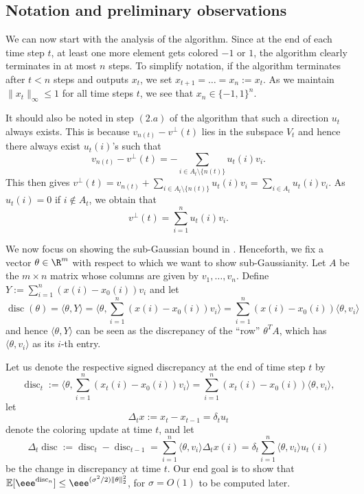 \documentclass{toc}
\newcommand\E{\mathbb{E}}
\DeclareMathOperator{\disc}{disc}   %
\begin{document}
%
\subsection{Notation and preliminary observations}    %
We can now start with the analysis of the algorithm. Since at the end of each
time step $t$, at least one more element gets colored $-1$ or $1$, the algorithm
clearly terminates in at most $n$ steps. To simplify
%
notation,     %
if the algorithm
terminates after $t<n$ steps and outputs $x_t$, we set $x_{t+1}=\ldots=x_n := x_t$.
As we maintain $\| x_t\|_{\infty} \leq 1$ for all time steps $t$, we see that $x_n\in \{-1,1\}^n$.

It should also be noted in step $(2.a)$ of the algorithm that such a direction $u_t$ always exists. This is because $v_{n(t)}-v^{\perp}(t)$ lies in the subspace $V_t$ and hence there always exist $u_t(i)$'s such that
\[ v_{n(t)}-v^{\perp}(t) = -\sum_{i\in A_t \setminus \{n(t)\}} u_t(i) v_i.\]
This then gives $v^{\perp}(t) = v_{n(t)} + \sum_{i\in A_t \setminus \{n(t)\}} u_t(i) v_i = \sum_{i \in A_t}  u_t(i) v_i$. As $u_t(i)=0$ if $i \notin A_t$, we obtain that
\begin{equation}\label{eq:disc_update_t}
v^{\perp}(t)=\sum_{i=1}^n u_t(i) v_i.
\end{equation}

We now focus on showing the sub-Gaussian bound in .
Henceforth, we fix a vector $\theta \in \R^m$ with respect to which we want to show
sub-Gaussianity. Let $A$ be the $m \times n$ matrix whose columns are given by
$v_1,\ldots,v_n$. Define $Y := \sum_{i=1}^n (x(i)-x_0(i))v_i$ and let
\[\disc(\theta)=\langle \theta,Y \rangle =   \langle \theta,\sum_{i=1}^n (x(i)-x_0(i)) v_i \rangle = \sum_{i=1}^n (x(i)-x_0(i)) \langle \theta,v_i \rangle \]
 and hence $\langle \theta,Y \rangle $ can be seen as the discrepancy of the ``row'' $\theta^TA$, which has $\langle \theta,v_i \rangle$ as its $i$-th entry.




Let us denote the respective signed discrepancy
at the end of time step $t$ by
\[
\disc_t := \langle \theta, \sum_{i=1}^n  (x_t(i)-x_0(i)) v_i\rangle =
\sum_{i=1}^n  (x_t(i)-x_0(i))\langle \theta,v_i  \rangle,
\]
let
\[
\Delta_t x := x_t - x_{t-1} = \delta_t u_t
\]
denote the coloring update at time $t$, and let
\[
\Delta_t \disc := \disc_t - \disc_{t-1} = \sum_{i=1}^n \langle \theta,v_i  \rangle \Delta_t x(i)
= \delta_t \sum_{i=1}^n \langle \theta, v_i \rangle u_t(i)
\]
be the change in discrepancy at time $t$. Our end goal
is to show that $\E[\eee^{\disc_n}] \leq \eee^{(\sigma^2/2) \|\theta\|_2^2}$, for $\sigma
= O(1)$ to be computed later.
\end{document}
